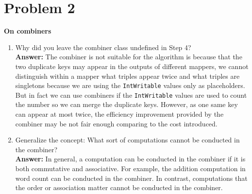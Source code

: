 \documentclass[letterpaper, 11pt]{article}
\begin{document}
\section*{Problem 2}
\textbf{On combiners}
\begin{enumerate}
    \item Why did you leave the combiner class undefined in Step 4?\\
        \textbf{Answer:} The combiner is not suitable for the algorithm is because that the two duplicate keys may appear in the outputs of different mappers, we cannot distinguish within a mapper what triples appear twice and what triples are singletons because we are using the \texttt{IntWritable} values only as placeholders. But in fact we can use combiners if the \texttt{IntWritable} values are used to count the number so we can merge the duplicate keys. However, as one same key can appear
        at most twice, the efficiency improvement provided by the combiner may be not fair enough comparing to the cost introduced.
    \item Generalize the concept: What sort of computations cannot be conducted in the combiner?\\
        \textbf{Answer:} In general, a computation can be conducted in the combiner if it is both commutative and associative. For example, the addition computation in word count can be conducted in the combiner. In contrast, computations that the order or association matter cannot be conducted in the combiner.
\end{enumerate}
\end{document}
